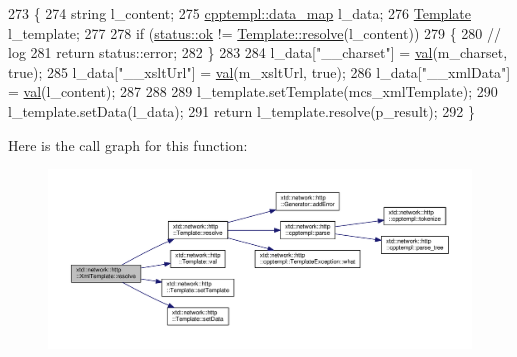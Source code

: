 \begin{DoxyCode}
273 \{
274   \textcolor{keywordtype}{string}        l\_content;
275   \hyperlink{namespacextd_1_1network_1_1http_1_1cpptempl_a638d1d81c8fb63c0bbafd508d6a2a007}{cpptempl::data\_map} l\_data;
276   \hyperlink{classxtd_1_1network_1_1http_1_1Template_a1887dcae44d24a8594bc41a349a7e6fe}{Template}           l\_template;
277 
278   \textcolor{keywordflow}{if} (\hyperlink{namespacextd_1_1network_1_1http_a55148922a7d13fe756e53e2ccad4b89ca444bcb3a3fcf8389296c49467f27e1d6}{status::ok} != \hyperlink{classxtd_1_1network_1_1http_1_1Template_a476ce5e5b8465ea80ade07c003ab5cfd}{Template::resolve}(l\_content))
279   \{
280     \textcolor{comment}{// log}
281     \textcolor{keywordflow}{return} status::error;
282   \}
283 
284   l\_data[\textcolor{stringliteral}{"\_\_charset"}] = \hyperlink{classxtd_1_1network_1_1http_1_1Template_aab2224df74586a476877a36db8ea2473}{val}(m\_charset, \textcolor{keyword}{true});
285   l\_data[\textcolor{stringliteral}{"\_\_xsltUrl"}] = \hyperlink{classxtd_1_1network_1_1http_1_1Template_aab2224df74586a476877a36db8ea2473}{val}(m\_xsltUrl, \textcolor{keyword}{true});
286   l\_data[\textcolor{stringliteral}{"\_\_xmlData"}] = \hyperlink{classxtd_1_1network_1_1http_1_1Template_aab2224df74586a476877a36db8ea2473}{val}(l\_content);
287 
288 
289   l\_template.setTemplate(mcs\_xmlTemplate);
290   l\_template.setData(l\_data);
291   \textcolor{keywordflow}{return} l\_template.resolve(p\_result);
292 \}
\end{DoxyCode}


Here is the call graph for this function\+:
\nopagebreak
\begin{figure}[H]
\begin{center}
\leavevmode
\includegraphics[width=350pt]{classxtd_1_1network_1_1http_1_1XmlTemplate_ab221547a643e3db5ba99640fe14b9f68_cgraph}
\end{center}
\end{figure}



